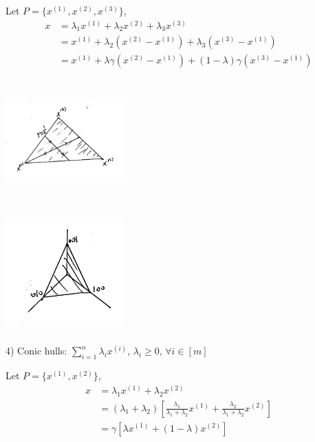 Let $P = \{x^{(1)},  x^{(2)}, x^{(3)} \}$,
\begin{align*}
x 
&= \lambda_1x^{(1)} + \lambda_2x^{(2)} + \lambda_3x^{(3)}\\
&= x^{(1)} + \lambda_2(x^{(2)} - x^{(1)}) + \lambda_3(x^{(3)} - x^{(1)})\\
&= x^{(1)} + \lambda \gamma(x^{(2)} - x^{(1)}) + (1 - \lambda)\gamma(x^{(3)} - x^{(1)})
\end{align*}


\begin{marginfigure}
	\centering
	\includegraphics[width=1.8in,height=1.8in]{figures/ch08/figure1023_2.png}
\end{marginfigure}

\begin{marginfigure}
	\centering
	\includegraphics[width=1.8in,height=1.8in]{figures/ch08/figure1023_3.png}
\end{marginfigure}

4) Conic hulls: $\sum^n_{i=1}\lambda_i x^{(i)}$, $\lambda_i \geq 0$, $\forall i\in [m]$

Let $P = \{x^{(1)}, x^{(2)} \}$,
\begin{align*}
x 
&= \lambda_1x^{(1)} + \lambda_2x^{(2)}\\
&= ( \lambda_1 + \lambda_2)[\frac{\lambda_1}{\lambda_1 + \lambda_2}x^{(1)} + \frac{\lambda_2}{\lambda_1 + \lambda_2}x^{(2)}]\\
&= \gamma[\lambda x^{(1)} + (1-\lambda)x^{(2)}]
\end{align*}

